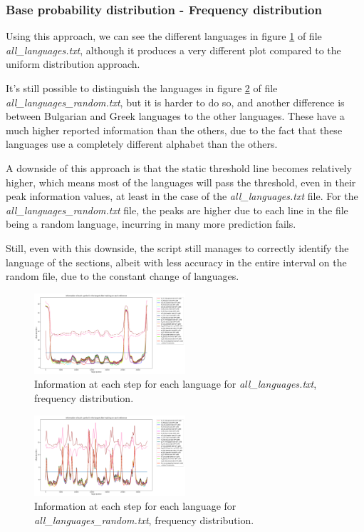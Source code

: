 \documentclass{article}
\begin{document}
\subsubsection{Base probability distribution - Frequency distribution}
\label{subsubsec:results_locate_lang_frequency_distribution}

Using this approach, we can see the different languages in figure \ref{fig:all_languages_p_f} of file \textit{all\_languages.txt}, although it produces a very different plot
compared to the uniform distribution approach.

It's still possible to distinguish the languages in figure \ref{fig:all_languages_random_p_f} of file \textit{all\_languages\_random.txt}, but it is harder to do so,
and another difference is between Bulgarian and Greek languages to the other languages. These have a much higher reported information than the others, due to the fact that these
languages use a completely different alphabet than the others.

A downside of this approach is that the static threshold line becomes relatively higher, which means most of the languages will pass the threshold, even in their peak information values,
at least in the case of the \textit{all\_languages.txt} file. For the \textit{all\_languages\_random.txt} file, the peaks are higher due to each line in the file being a random language, incurring in many more prediction fails.

Still, even with this downside, the script still manages to correctly identify the language of the sections, albeit with less accuracy in the entire interval on the random file,
due to the constant change of languages.

\begin{figure}
    \centering
    \includegraphics[width=0.5\textwidth]{../results/all_languages/-p_f.png}
    \caption{Information at each step for each language for \textit{all\_languages.txt}, frequency distribution.}
    \label{fig:all_languages_p_f}
\end{figure}

\begin{figure}
    \centering
    \includegraphics[width=0.5\textwidth]{../results/all_languages_random/-p_f.png}
    \caption{Information at each step for each language for \textit{all\_languages\_random.txt}, frequency distribution.}
    \label{fig:all_languages_random_p_f}
\end{figure}
\end{document}
